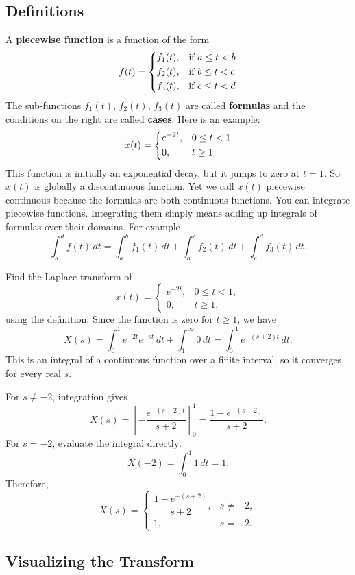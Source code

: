 \documentclass[10pt,letterpaper]{article}
\begin{document}
\subsection{Definitions}
A \textbf{piecewise function} is a function of the form
$$
    f(t) = \begin{dcases}
        f_1(t), & \text{if } a \le t < b\\ 
        f_2(t), & \text{if } b \le t < c\\
        f_3(t), & \text{if }c \le t < d
    \end{dcases}
$$
The sub-functions $f_1(t)$, $f_2(t)$, $f_3(t)$ are called \textbf{formulas} and the conditions on the right are called \textbf{cases}. Here is an example:
$$
x(t) =
\begin{dcases}
e^{-2t}, & 0 \le t < 1 \\
0, & t \ge 1
\end{dcases}
$$
This function is initially an exponential decay, but it jumps to zero at $t=1$. So $x(t)$ is globally a discontinuous function. Yet we call $x(t)$ piecewise continuous because the formulas are both continuous functions. You can integrate piecewise functions. Integrating them simply means adding up integrals of formulas over their domains. For example 
$$
\int_a^d f(t) \,dt = \int_a^b f_1(t)\,dt + \int_b^c f_2(t)\,dt + \int_c^d f_3(t)\,dt.
$$

\begin{example}[4]{
Find the Laplace transform of
\[
x(t)=
\begin{cases}
e^{-2t}, & 0\le t<1,\\
0, & t\ge1,
\end{cases}
\]
using the definition.
}
Since the function is zero for $t\ge1$, we have
\[
X(s)=\int_0^1 e^{-2t}e^{-st}\,dt
+\int_1^\infty 0\,dt
=\int_0^1 e^{-(s+2)t}\,dt.
\]
This is an integral of a continuous function over a finite
interval, so it converges for every real $s$.

For $s\ne-2$, integration gives
\[
X(s)=
\left[-\frac{e^{-(s+2)t}}{s+2}\right]_0^1
=\frac{1-e^{-(s+2)}}{s+2}.
\]
For $s=-2$, evaluate the integral directly:
\[
X(-2)=\int_0^1 1\,dt=1.
\]
Therefore,
\[
\boxed{
X(s)=
\begin{cases}
\dfrac{1-e^{-(s+2)}}{s+2}, & s\ne-2,\\[6pt]
1, & s=-2.
\end{cases}
}
\]
\end{example}

\subsection{Visualizing the Transform}
\end{document}
